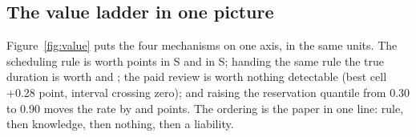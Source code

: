 \clearpage
\subsection*{The value ladder in one picture}

Figure~\ref{fig:value} puts the four mechanisms on one axis, in the same units.
The scheduling rule is worth \slotPValueRuleSTwo{} points in S\slotCaseTwo{} and
\slotPValueRuleSThree{} in S\slotCaseThree{}; handing the same rule the true duration is
worth \slotPValueTruthSTwo{} and \slotPValueTruthSThree{}; the paid review is worth
nothing detectable (best cell +0.28 point, interval crossing zero); and raising the
reservation quantile from 0.30 to 0.90 moves the rate by
\slotPValueReserveSTwo{} and \slotPValueReserveSThree{} points. The ordering is the
paper in one line: rule, then knowledge, then nothing, then a liability.

